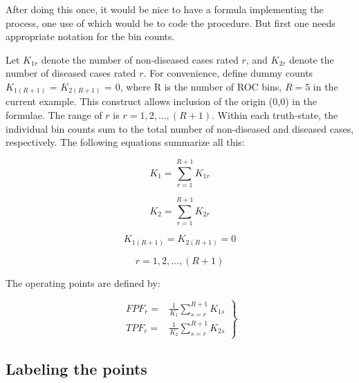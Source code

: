 \documentclass[
]{book}
\begin{document}
After doing this once, it would be nice to have a formula implementing the process, one use of which would be to code the procedure. But first one needs appropriate notation for the bin counts.

Let \(K_{1r}\) denote the number of non-diseased cases rated \(r\), and \(K_{2r}\) denote the number of diseased cases rated \(r\). For convenience, define dummy counts \(K_{1{(R+1)}}\) = \(K_{2{(R+1)}}\) = 0, where R is the number of ROC bins, \(R = 5\) in the current example. This construct allows inclusion of the origin (0,0) in the formulae. The range of \(r\) is \(r = 1,2,...,(R+1)\). Within each truth-state, the individual bin counts sum to the total number of non-diseased and diseased cases, respectively. The following equations summarize all this:

\begin{equation*} 
K_1=\sum_{r=1}^{R+1}K_{1r}
\end{equation*}

\begin{equation*} 
K_2=\sum_{r=1}^{R+1}K_{2r}
\end{equation*}

\begin{equation*} 
K_{1{(R+1)}} = K_{2{(R+1)}} = 0
\end{equation*}

\begin{equation*} 
r = 1,2,...,(R+1)
\end{equation*}

The operating points are defined by:

\begin{equation}
\left. 
\begin{aligned}
FPF_r=& \frac {1} {K_1} \sum_{s=r}^{R+1}K_{1s}\\
TPF_r=& \frac {1} {K_2} \sum_{s=r}^{R+1}K_{2s}
\end{aligned}
\right \}
\label{eq:ratings-paradigm-FPF-TPF-from-counts}
\end{equation}

\hypertarget{labeling-the-points}{%
\subsection{Labeling the points}\label{labeling-the-points}}
\end{document}
